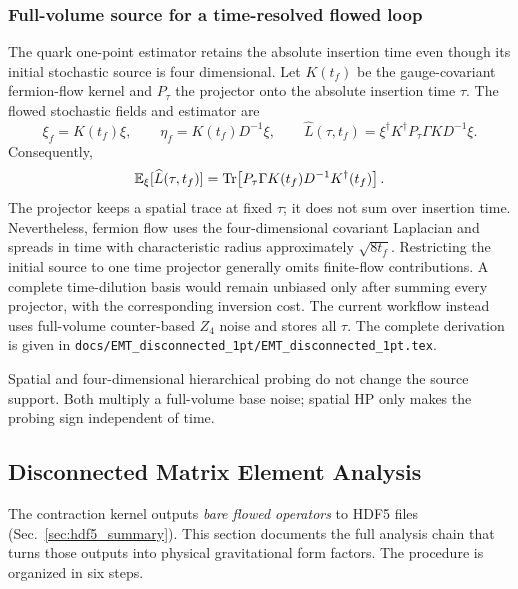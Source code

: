 \documentclass[11pt,a4paper]{article}
\newcommand{\code}[1]{\texttt{#1}}
\begin{document}
\subsubsection{Full-volume source for a time-resolved flowed loop}

The quark one-point estimator retains the absolute insertion time even though
its initial stochastic source is four dimensional.  Let \(K(t_f)\) be the
gauge-covariant fermion-flow kernel and \(P_\tau\) the projector onto the
absolute insertion time \(\tau\).  The flowed stochastic fields and estimator
are
\begin{equation}
  \xi_f=K(t_f)\xi,
  \qquad
  \eta_f=K(t_f)D^{-1}\xi,
  \qquad
  \widehat L(\tau,t_f)
  =\xi^\dagger K^\dagger P_\tau\Gamma K D^{-1}\xi.
\end{equation}
Consequently,
\begin{equation}
  \mathbb{E}_\xi[\widehat L(\tau,t_f)]
  =\Tr\!\left[P_\tau\Gamma K(t_f)D^{-1}K^\dagger(t_f)\right].
  \label{eq:pion_full_volume_flowed_loop}
\end{equation}
The projector keeps a spatial trace at fixed \(\tau\); it does not sum over
insertion time.  Nevertheless, fermion flow uses the four-dimensional
covariant Laplacian and spreads in time with characteristic radius
approximately \(\sqrt{8t_f}\).  Restricting the initial source to one time
projector generally omits finite-flow contributions.  A complete time-dilution
basis would remain unbiased only after summing every projector, with the
corresponding inversion cost.  The current workflow instead uses full-volume
counter-based \(Z_4\) noise and stores all \(\tau\).  The complete derivation is
given in
\code{docs/EMT\_disconnected\_1pt/EMT\_disconnected\_1pt.tex}.

Spatial and four-dimensional hierarchical probing do not change the source
support.  Both multiply a full-volume base noise; spatial HP only makes the
probing sign independent of time.

\subsection{Disconnected Matrix Element Analysis}
\label{sec:analysis}

The contraction kernel outputs \emph{bare flowed operators} to HDF5 files (Sec.~\ref{sec:hdf5_summary}).
This section documents the full analysis chain that turns those outputs into physical gravitational form factors.
The procedure is organized in six steps.
\end{document}
